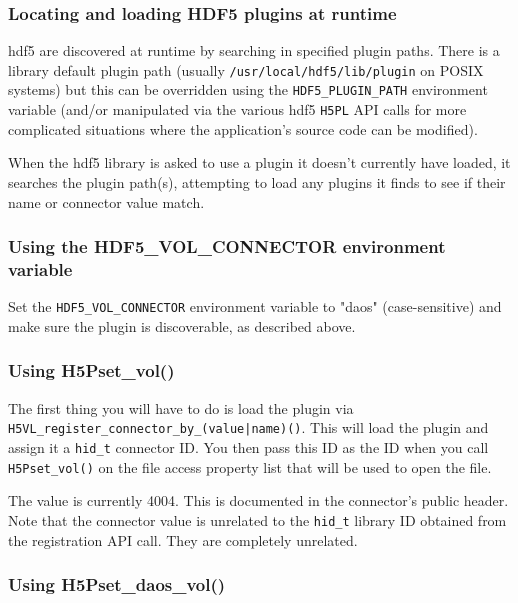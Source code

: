 \documentclass[../users_guide.tex]{subfiles}
\begin{document}
\subsubsection{Locating and loading HDF5 plugins at runtime}

\acrshort{hdf5} are discovered at runtime by searching in specified
plugin paths. There is a library default plugin path (usually
\texttt{/usr/local/hdf5/lib/plugin} on POSIX systems) but this can be
overridden using the \texttt{HDF5\_PLUGIN\_PATH} environment variable (and/or
manipulated via the various \acrshort{hdf5} \texttt{H5PL} API calls for more
complicated situations where the application's source code can be modified).

When the \acrshort{hdf5} library is asked to use a plugin it doesn't
currently have loaded, it searches the plugin path(s), attempting to load
any plugins it finds to see if their name or connector value match.

\subsubsection{Using the HDF5\_VOL\_CONNECTOR environment variable}

Set the \texttt{HDF5\_VOL\_CONNECTOR} environment variable to "daos"
(case-sensitive) and make sure the \dvc{} plugin is discoverable, as
described above.

\subsubsection{Using H5Pset\_vol()}

The first thing you will have to do is load the \dvc{} plugin via \newline
\texttt{H5VL\_register\_connector\_by\_(value|name)()}. This will load the
plugin and assign it a \texttt{hid\_t} connector ID. You then pass this
ID as the \vc{} ID when you call \texttt{H5Pset\_vol()} on the file access
property list that will be used to open the file.

The \dvc{} value is currently 4004. This is documented in the connector's
public header. Note that the connector value is unrelated to the
\texttt{hid\_t} library ID obtained from the registration API call. They are
completely unrelated.

\subsubsection{Using H5Pset\_daos\_vol()}
\end{document}
